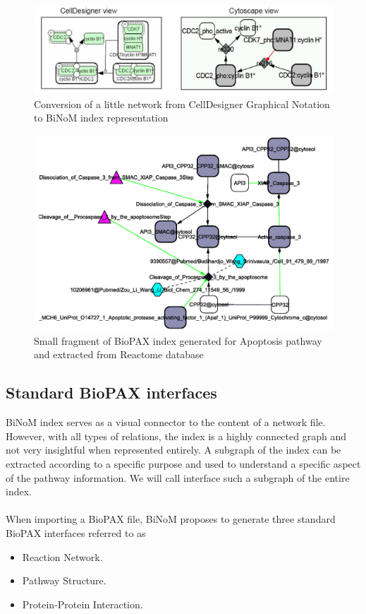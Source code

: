 \begin{figure}
\centering
\includegraphics[width=14 cm]{graphics/From_CellDesigner_to_Cytoscape}
\caption{Conversion of a little network from CellDesigner Graphical Notation to BiNoM index representation}
\label{From_CellDesigner_to_Cytoscape}
\end{figure}
\begin{figure}
\centering
\includegraphics[width=19 cm]{graphics/Fragment_of_Apoptosis_from_Reactome}
\caption{Small fragment of BioPAX index generated for Apoptosis pathway and extracted from Reactome database}
\label{Fragment_of_Apoptosis_from_Reactome}
\end{figure}

\subsection{Standard BioPAX interfaces}\label{Standard_BioPAX_Interfaces}
BiNoM index serves as a visual connector to the content of a network file. However, with all types of relations, the index is a highly connected graph and not very insightful when represented entirely. A subgraph of the index can be extracted according to a specific purpose and used to understand a specific aspect of the pathway information. We will call interface such a subgraph of the entire index.\\\\
When importing a BioPAX file, BiNoM proposes to generate three standard BioPAX interfaces referred to as
\nopagebreak
\begin{itemize}
\item Reaction Network.
\item Pathway Structure.
\item Protein-Protein Interaction.
\end{itemize}
